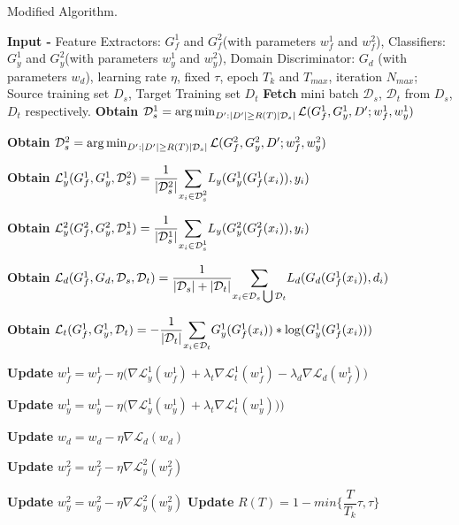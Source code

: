 \begin{algorithm}[H]
	\caption{Modified Algorithm.} 
	\begin{algorithmic}[1]
	    \State \textbf{Input -} Feature Extractors: $G_{f}^1$ and $G_{f}^2$(with parameters $w_{f}^1$ and $w_{f}^2$), Classifiers: $G_{y}^1$ and $G_{y}^2$(with parameters $w_{y}^1$ and $w_{y}^2$), Domain Discriminator: $G_d$ (with parameters $w_d$), learning rate $\eta$, fixed $\tau$, epoch $T_k$ and $T_{max}$, iteration $N_{max}$;
		    \State Source training set ${D_s}$, Target Training set ${D_t}$
				    \State \textbf{Fetch} mini batch $\mathcal{D}_s$, $\mathcal{D}_t$ from ${D_s}$, ${D_t}$ respectively.
				    \State \textbf{Obtain} $\mathcal{D}_{s}^1 = \operatorname*{arg\,min}_{D':|D'|\geq R(T)|\mathcal{D}_{s}|} \mathcal{L}(G_{f}^1, G_{y}^1, D'; w_{f}^1, w_{y}^1)$ 
				    
				    \State \textbf{Obtain} $\mathcal{D}_{s}^2 = \operatorname*{arg\,min}_{D':|D'|\geq R(T)|\mathcal{D}_{s}|} \mathcal{L}(G_{f}^2, G_{y}^2, D'; w_{f}^2, w_{y}^2)$
				
				    \State \textbf{Obtain} $\mathcal{L}_{y}^1(G_{f}^1, G_{y}^1,\mathcal{D}_{s}^2) =\dfrac{1}{|\mathcal{D}_{s}^2|} \mathlarger\sum\limits_{x_i \in \mathcal{D}_{s}^2} L_y(G_{y}^1(G_{f}^1(x_i)),y_i)$
				    
                    \State \textbf{Obtain} $\mathcal{L}_{y}^2(G_{f}^2, G_{y}^2, \mathcal{D}_{s}^1) =\dfrac{1}{|\mathcal{D}_{s}^1|} \mathlarger\sum\limits_{x_i \in \mathcal{D}_{s}^1} L_y(G_{y}^2(G_{f}^2(x_i)),y_i)$
				    
				    \State \textbf{Obtain} $\mathcal{L}_d(G_{f}^1, G_{d}, \mathcal{D}_s, \mathcal{D}_t) = \dfrac{1}{|\mathcal{D}_s| + |\mathcal{D}_t|} \mathlarger\sum\limits_{x_i \in \mathcal{D}_s \bigcup \mathcal{D}_t} L_d(G_d(G_{f}^1(x_i)), d_i)$
				    
				    \State \textbf{Obtain} $\mathcal{L}_t(G_{f}^1, G_{y}^1, \mathcal{D}_t) = - \dfrac{1}{|\mathcal{D}_t|} \mathlarger\sum\limits_{x_i \in \mathcal{D}_t} G_{y}^1(G_{f}^1(x_i))*\log(G_{y}^1(G_{f}^1(x_i)))$
				    
				    \State \textbf{Update} $w_{f}^1 = w_{f}^1 - \eta \big( \nabla \mathcal{L}_{y}^1(w_{f}^1) + \lambda_t \nabla \mathcal{L}_{t}^1(w_{f}^1) - \lambda_d \nabla \mathcal{L}_{d}(w_{f}^1)\big)$
				    
				    \State \textbf{Update} $w_{y}^1 = w_{y}^1 - \eta \big(\nabla \mathcal{L}_{y}^1(w_{y}^1)+ \lambda_t \nabla\mathcal{L}_{t}^1(w_{y}^1))\big)$
				    
				    \State \textbf{Update} $w_{d} = w_{d} - \eta \nabla \mathcal{L}_{d}(w_{d})$
				    
				    \State \textbf{Update} $w_{f}^2 = w_{f}^2 - \eta \nabla \mathcal{L}_{y}^2(w_{f}^2)$
				    
				    \State \textbf{Update} $w_{y}^2 = w_{y}^2 - \eta \nabla \mathcal{L}_{y}^2(w_{y}^2)$
			    \EndFor
			 \State \textbf{Update} $R(T)= 1- min\bigg\{\dfrac{T}{T_k}\tau, \tau\bigg\}$
	\EndFor
	\end{algorithmic} 
\end{algorithm}
